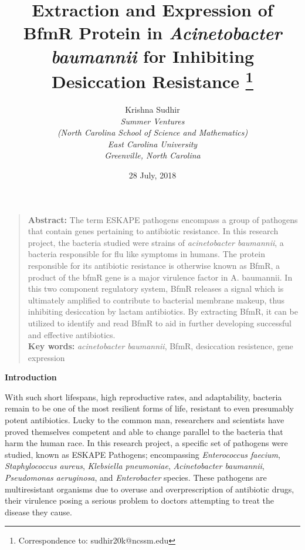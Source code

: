 \documentclass[11pt]{article}
\begin{document}

\title{Extraction and Expression of BfmR Protein in \emph{Acinetobacter baumannii} for Inhibiting Desiccation Resistance
\thanks{
Correspondence to:  sudhir20k@ncssm.edu}
}


\author{Krishna Sudhir\\
{\it Summer Ventures}\\
{\it (North Carolina School of Science and Mathematics)}\\
{\it  East Carolina University}\\
{\it Greenville, North Carolina}\\
 }
\date{28 July, 2018}

\maketitle  %


\begin{quotation}
\textbf{Abstract:}  The term ESKAPE pathogens encompass a group of pathogens that contain genes pertaining to antibiotic resistance. In this research project, the bacteria studied were strains of \emph{acinetobacter baumannii}, a bacteria responsible for flu like symptoms in humans. The protein responsible for its antibiotic resistance is otherwise known as BfmR, a product of the bfmR gene is a major virulence factor in A. baumannii. In this two component regulatory system, BfmR releases a
signal which is ultimately amplified to contribute to bacterial membrane makeup, thus inhibiting desiccation by lactam antibiotics. By extracting BfmR, it can be utilized to identify and read BfmR to aid in further developing successful and effective antibiotics. \\




\textbf{Key words:} \emph{acinetobacter baumannii}, BfmR, desiccation resistence, gene expression

\end{quotation}

\newpage
{\bf Introduction}

With such short lifespans, high reproductive rates, and adaptability, bacteria remain to be
one of the most resilient forms of life, resistant to even presumably potent antibiotics. Lucky to the common man, researchers and scientists have proved themselves competent and able to change parallel to the bacteria that harm the human race. In this research project, a specific set of pathogens were studied, known as ESKAPE Pathogens; encompassing \emph{Enterococcus faecium}, \emph{Staphylococcus aureus}, \emph{Klebsiella pneumoniae}, \emph{Acinetobacter baumannii}, \emph{Pseudomonas aeruginosa}, and \emph{Enterobacter} species. These pathogens are multiresistant organisms due to overuse and overprescription of antibiotic drugs, their virulence posing a serious problem to doctors attempting to treat the disease they cause.
 
\end{document}
